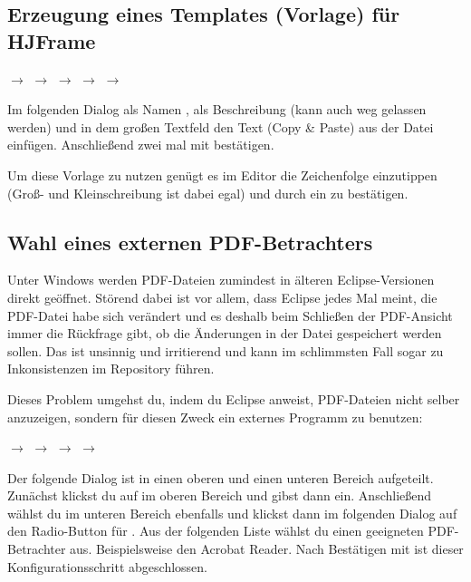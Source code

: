 \subsection{Erzeugung eines Templates (Vorlage) für HJFrame}

 $\rightarrow$  $\rightarrow$ 
$\rightarrow$  $\rightarrow$  $\rightarrow$

Im folgenden Dialog als Namen , als Beschreibung (kann
auch weg gelassen werden)  und in dem großen Textfeld  den
Text (Copy \& Paste) aus der Datei  einfügen.
Anschließend zwei mal mit  bestätigen.

Um diese Vorlage zu nutzen genügt es im Editor die Zeichenfolge
 einzutippen (Groß- und Kleinschreibung ist dabei egal) und
durch ein  zu bestätigen.


\subsection{Wahl eines externen PDF-Betrachters}

Unter Windows werden PDF-Dateien zumindest in älteren Eclipse-Versionen direkt
geöffnet. Störend dabei ist vor allem, dass Eclipse jedes Mal meint, die
PDF-Datei habe sich verändert und es deshalb beim Schließen der PDF-Ansicht
immer die Rückfrage gibt, ob die Änderungen in der Datei gespeichert werden
sollen. Das ist unsinnig und irritierend und kann im schlimmsten Fall sogar zu
Inkonsistenzen im Repository führen.

Dieses Problem umgehst du, indem du Eclipse anweist, PDF-Dateien nicht selber
anzuzeigen, sondern für diesen Zweck ein externes Programm zu benutzen:

 $\rightarrow$  $\rightarrow$ 
$\rightarrow$  $\rightarrow$ 

Der folgende Dialog ist in einen oberen und einen unteren Bereich aufgeteilt.
Zunächst klickst du auf  im oberen Bereich und gibst dann
 ein. Anschließend wählst du im unteren Bereich ebenfalls
 und klickst dann im folgenden Dialog auf den Radio-Button für
. Aus der folgenden Liste wählst du einen geeigneten
PDF-Betrachter aus. Beispielsweise den Acrobat Reader. Nach Bestätigen mit
 ist dieser Konfigurationsschritt abgeschlossen.

